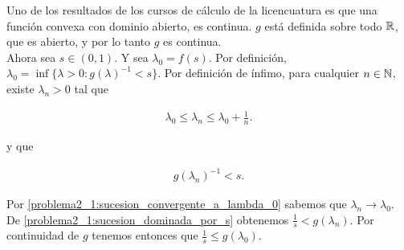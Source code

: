     Uno de los resultados de los cursos de cálculo de la licencuatura es que una función convexa con dominio abierto, es continua.
    $g$ está definida sobre todo $\mathbb{R}$, que es abierto, y por lo tanto $g$ es continua.\\
    
    Ahora sea $s \in (0,1)$. Y sea $\lambda_0 = f(s)$. Por definición, $\lambda_0 = \inf\{ \lambda > 0 : g(\lambda)^{-1} < s\}$. Por definición de ínfimo,
    para cualquier $n \in \mathbb{N}$, existe $\lambda_n > 0$ tal que 
    
    \begin{align}
        \lambda_0 \leq \lambda_n \leq \lambda_0 + \frac{1}{n}. \label{problema2_1:sucesion_convergente_a_lambda_0}
    \end{align}
     
    y que
    
    \begin{align}
        g(\lambda_n)^{-1} < s. \label{problema2_1:sucesion_dominada_por_s}
    \end{align}
    
    Por \eqref{problema2_1:sucesion_convergente_a_lambda_0} sabemos que $\lambda_n \rightarrow \lambda_0$.
    De \eqref{problema2_1:sucesion_dominada_por_s} obtenemos $\frac{1}{s} < g(\lambda_n)$. Por continuidad de $g$
    tenemos entonces que $\frac{1}{s} \leq g(\lambda_0)$.